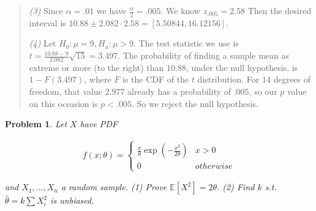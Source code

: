 \documentclass[a4paper, 12pt]{article}
\newtheorem{problem}{Problem}
\newtheorem{problem}{Problem}
\begin{document}
\begin{quote}
\textit{(3)} Since $\alpha = .01$ we have $\frac{\alpha}{2} = .005$. We know
$z_{.005} = 2.58$ Then the desired interval is $10.88 \pm 2.082 \cdot 2.58 = [
5.50844, 16.12156  ] $.

\textit{(4)} Let $H_0 : \mu = 9, H_a : \mu > 9$. The test statistic we use is $t
= \frac{10.88 - 9}{2.082} \sqrt{15}  = 3.497$. The probability of finding a sample mean as extreme
or more (to the right) than $10.88$, under the null hypothesis, is $1 -
F(3.497)$, where $F$ is the CDF of the $t$ distribution. For $14$ degrees of
freedom, that value $2.977$ already has a probability of $.005$, so our $p$
value on this occasion is $p < .005$. So we reject the null hypothesis.


\end{quote}
\normalsize

\pagebreak 

\begin{problem}

    Let $X$ have PDF 

    \begin{align*}
        f(x; \theta) = \begin{cases}
            \frac{x}{\theta} \exp (-\frac{x^2}{2\theta}) & x > 0 \\ 
            0 & otherwise
        \end{cases}
    \end{align*}

    and $X_1, \ldots, X_n$ a random sample. (1) Prove $\mathbb{E}\left[ X^2 \right]
    = 2 \theta$. (2) Find $k$ s.t. $\hat{\theta} = k \sum X_i^2$ is unbiased.
    
\end{problem}
\end{document}
